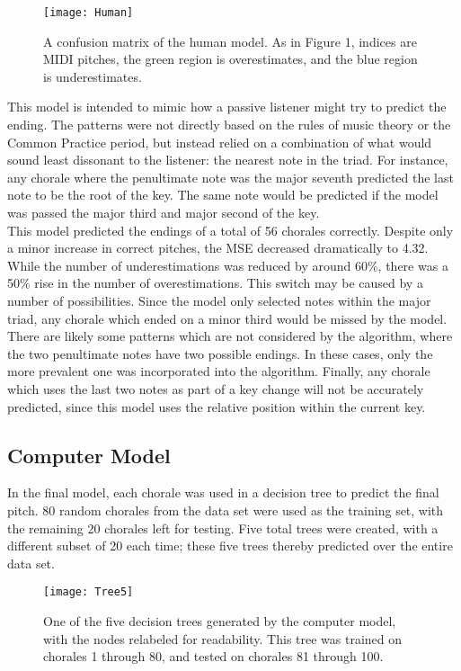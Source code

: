 \documentclass[12pt]{article}
\begin{document}
\begin{figure}[h]
  \texttt{[image: Human]}
  \centering
  \caption{A confusion matrix of the human model. As in Figure 1, indices are MIDI pitches, the green region is overestimates, and the blue region is underestimates.}
\end{figure}


This model is intended to mimic how a passive listener might try to predict the ending. The patterns were not directly based on the rules of music theory or the Common Practice period, but instead relied on a combination of what would sound least dissonant to the listener: the nearest note in the triad. For instance, any chorale where the penultimate note was the major seventh predicted the last note to be the root of the key. The same note would be predicted if the model was passed the major third and major second of the key.\\

This model predicted the endings of a total of 56 chorales correctly. Despite only a minor increase in correct pitches, the MSE decreased dramatically to 4.32. While the number of underestimations was reduced by around 60\%, there was a 50\% rise in the number of overestimations. This switch may be caused by a number of possibilities. Since the model only selected notes within the major triad, any chorale which ended on a minor third would be missed by the model. There are likely some patterns which are not considered by the algorithm, where the two penultimate notes have two possible endings. In these cases, only the more prevalent one was incorporated into the algorithm. Finally, any chorale which uses the last two notes as part of a key change will not be accurately predicted, since this model uses the relative position within the current key.

\subsection{Computer Model}
In the final model, each chorale was used in a decision tree to predict the final pitch. 80 random chorales from the data set were used as the training set, with the remaining 20 chorales left for testing. Five total trees were created, with a different subset of 20 each time; these five trees thereby predicted over the entire data set.\\

\begin{figure}[h]
  \texttt{[image: Tree5]}
  \centering
  \caption{One of the five decision trees generated by the computer model, with the nodes relabeled for readability. This tree was trained on chorales 1 through 80, and tested on chorales 81 through 100.}
\end{figure}
\end{document}
